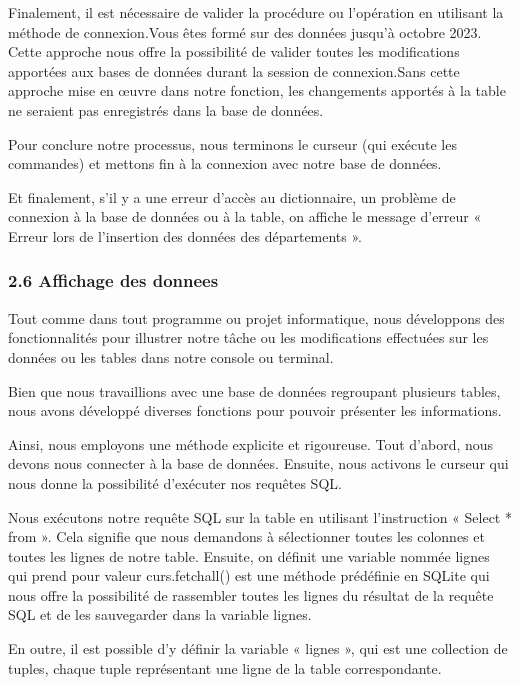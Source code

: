 \documentclass[
]{article}
\begin{document}
Finalement, il est nécessaire de valider la procédure ou l'opération en
utilisant la méthode de connexion.Vous êtes formé sur des données
jusqu'à octobre 2023. Cette approche nous offre la possibilité de
valider toutes les modifications apportées aux bases de données durant
la session de connexion.Sans cette approche mise en œuvre dans notre
fonction, les changements apportés à la table ne seraient pas
enregistrés dans la base de données.

Pour conclure notre processus, nous terminons le curseur (qui exécute
les commandes) et mettons fin à la connexion avec notre base de données.

Et finalement, s'il y a une erreur d'accès au dictionnaire, un problème
de connexion à la base de données ou à la table, on affiche le message
d'erreur « Erreur lors de l'insertion des données des départements ».

\subsubsection{2.6 Affichage des donnees}\label{affichage-des-donnees}

Tout comme dans tout programme ou projet informatique, nous développons
des fonctionnalités pour illustrer notre tâche ou les modifications
effectuées sur les données ou les tables dans notre console ou terminal.

Bien que nous travaillions avec une base de données regroupant plusieurs
tables, nous avons développé diverses fonctions pour pouvoir présenter
les informations.

Ainsi, nous employons une méthode explicite et rigoureuse. Tout d'abord,
nous devons nous connecter à la base de données. Ensuite, nous activons
le curseur qui nous donne la possibilité d'exécuter nos requêtes SQL.

Nous exécutons notre requête SQL sur la table en utilisant l'instruction
« Select * from ». Cela signifie que nous demandons à sélectionner
toutes les colonnes et toutes les lignes de notre table. Ensuite, on
définit une variable nommée lignes qui prend pour valeur curs.fetchall()
est une méthode prédéfinie en SQLite qui nous offre la possibilité de
rassembler toutes les lignes du résultat de la requête SQL et de les
sauvegarder dans la variable lignes.

En outre, il est possible d'y définir la variable « lignes », qui est
une collection de tuples, chaque tuple représentant une ligne de la
table correspondante.
\end{document}

